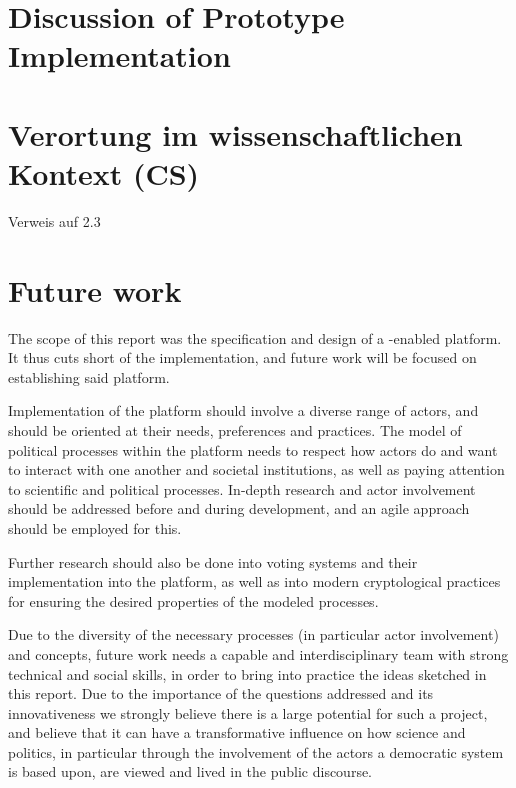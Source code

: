\section{Discussion of Prototype Implementation}
\label{sec:DiscussionImplementation}

\section{Verortung im wissenschaftlichen Kontext (CS)}
\label{sec:DiscussionScientificContext}

Verweis auf 2.3


\section{Future work}
\label{sec:FutureWork}

The scope of this report was the specification and design of a -enabled  platform. It thus cuts short of the implementation, and future work will be focused on establishing said platform. 

Implementation of the platform should involve a diverse range of actors, and should be oriented at their needs, preferences and practices. The model of political processes within the platform needs to respect how actors do and want to interact with one another and societal institutions, as well as paying attention to scientific and political processes. In-depth research and actor involvement should be addressed before and during development, and an agile approach should be employed for this. 

Further research should also be done into voting systems and their implementation into the platform, as well as into modern cryptological practices for ensuring the desired properties of the modeled processes.

Due to the diversity of the necessary processes (in particular actor involvement) and concepts, future work needs a capable and interdisciplinary team with strong technical and social skills, in order to bring into practice the ideas sketched in this report. Due to the importance of the questions addressed and its innovativeness we strongly believe there is a large potential for such a project, and believe that it can have a transformative influence on how science and  politics, in particular through the involvement of the actors a democratic system is based upon, are viewed and lived in the public discourse.